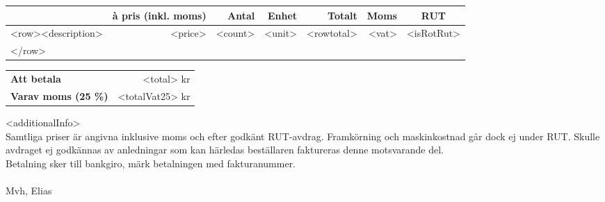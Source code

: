 \documentclass[a4paper,11pt]{extarticle}
\newcommand{\changefont}{%
        \fontsize{9}{11}\selectfont
    }
\newcommand{\tblhdr}{%
\fontsize{9}{11}\selectfont\color{white}
}
\begin{document}
\begin{tabularx}{\linewidth}{Xrrrrrc}
\rowcolor{Primary}
\multicolumn{1}{l}{\tblhdr \color{white}\textbf{Beskrivning}} &
\tblhdr \color{white}\textbf{à pris (inkl. moms)} &
\tblhdr \color{white}\textbf{Antal} &
\tblhdr \color{white}\textbf{Enhet} &
\tblhdr \color{white}\textbf{Totalt} &
\tblhdr \color{white}\textbf{Moms} &
\tblhdr \textbf{RUT}\\
\hline
    <row><description> & <price> & <count> & <unit> & <rowtotal> & <vat> & <isRotRut>\\
    </row>
    & & & & & & \\
\end{tabularx}

\begin{tabularx}{\linewidth}{Xr}
\hline
    \textbf{Att betala} & <total> kr \\
    \textbf{Varav moms (25 \%)} & <totalVat25> kr \\
\hline
\end{tabularx}

\renewcommand\arraystretch{1}

\vspace{2em}
<additionalInfo> \\

Samtliga priser är angivna inklusive moms och efter godkänt RUT-avdrag. Framkörning och maskinkostnad går dock ej under RUT. Skulle avdraget ej godkännas av anledningar som kan härledas beställaren faktureras denne motsvarande del. \\

Betalning sker till bankgiro, märk betalningen med fakturanummer. \\
~\\
Mvh, Elias

\end{document}

